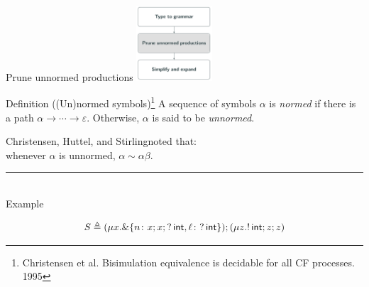 \documentclass[10pt]{beamer}
\begin{document}
\begin{frame} {Prune unnormed productions}
	\hfill\includegraphics[height=2.8cm]{img/prune.png}

	\vspace*{-2.8cm}
	\begin{varblock}[7.8cm]{Definition ((Un)normed symbols)\footnote{\label{note1} Christensen et al. Bisimulation equivalence is decidable for all CF processes. 1995} }
			\smallskip 
		A sequence of symbols $\alpha$ is \emph{normed} if there is a path $\alpha \rightarrow \cdots \rightarrow \varepsilon$. 
		Otherwise, $\alpha$ is said to be \emph{unnormed}.\\
	\end{varblock}

	Christensen, Huttel, and Stirling\footnotemark[\value{footnote}] noted that:\\\smallskip
	\hspace*{1cm}	whenever $\alpha$ is unnormed, $\alpha \sim \alpha \beta$.

	\pause
	\vspace*{-1mm}
	{\color{teal}\rule{3cm}{2pt}}\\
   	{\color{teal} Example} \\\smallskip
	\vspace*{-7mm}

	$$S \triangleq (\mu x. \&\{n\colon x;x;?\,\mathsf{int},
      \ell\colon ?\,\mathsf{int} \});( \mu z. !\,\mathsf{int}; z;z )$$


\end{frame}
\end{document}
